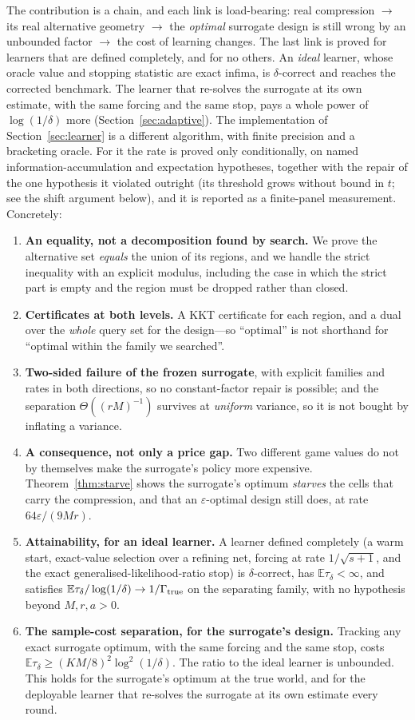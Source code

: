 The contribution is a chain, and each link is load-bearing:
real compression $\to$ its real alternative geometry $\to$ the \emph{optimal} surrogate
design is still wrong by an unbounded factor $\to$ the cost of learning changes. The last
link is proved for learners that are defined completely, and for no others. An
\emph{ideal} learner, whose oracle value and stopping statistic are exact infima, is
$\delta$-correct and reaches the corrected benchmark. The learner that re-solves the
surrogate at its own estimate, with the same forcing and the same stop, pays a whole power of
$\log(1/\delta)$ more (Section~\ref{sec:adaptive}). The implementation of
Section~\ref{sec:learner} is a different algorithm, with finite precision and a bracketing oracle. For it the rate is proved only
conditionally, on named information-accumulation and expectation hypotheses, together with
the repair of the one hypothesis it violated outright (its threshold grows without bound in
$t$; see the shift argument below), and it is reported as a finite-panel measurement.
Concretely:
\begin{enumerate}
\item[1)] \textbf{An equality, not a decomposition found by search.} We prove the
alternative set \emph{equals} the union of its regions, and we handle the strict inequality
with an explicit modulus, including the case in which the strict part is empty and the
region must be dropped rather than closed.
\item[2)] \textbf{Certificates at both levels.} A KKT certificate for each region, and a
dual over the \emph{whole} query set for the design---so ``optimal'' is not shorthand for
``optimal within the family we searched''.
\item[3)] \textbf{Two-sided failure of the frozen surrogate}, with explicit families and
rates in both directions, so no constant-factor repair is possible; and the separation
$\Theta((rM)^{-1})$ survives at \emph{uniform} variance, so it is not bought by inflating
a variance.
\item[4)] \textbf{A consequence, not only a price gap.} Two different game values do not by
themselves make the surrogate's policy more expensive. Theorem~\ref{thm:starve} shows the
surrogate's optimum \emph{starves} the cells that carry the compression, and that an
$\varepsilon$-optimal design still does, at rate $64\varepsilon/(9Mr)$.
\item[5)] \textbf{Attainability, for an ideal learner.} A learner defined completely (a warm
start, exact-value selection over a refining net, forcing at rate $1/\sqrt{s+1}$, and the
exact generalised-likelihood-ratio stop) is $\delta$-correct, has
$\mathbb{E}\tau_{\delta}<\infty$, and satisfies
$\mathbb{E}\tau_{\delta}/\log(1/\delta)\to1/\Gamma_{\rm true}$ on the separating family, with no
hypothesis beyond $M,r,a>0$.
\item[6)] \textbf{The sample-cost separation, for the surrogate's design.} Tracking any exact
surrogate optimum, with the same forcing and the same stop, costs
$\mathbb{E}\tau_{\delta}\ge(KM/8)^{2}\log^{2}(1/\delta)$. The ratio to the ideal learner is
unbounded. This holds for the surrogate's optimum at the true world, and for the deployable
learner that re-solves the surrogate at its own estimate every round.
\end{enumerate}

